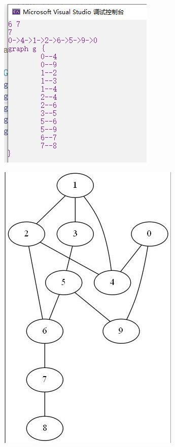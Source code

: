 \documentclass[UTF8]{article}
\begin{document}
	\begin{figure}[H]
		\begin{minipage}[H]{0.48\linewidth}
			\centering
			\includegraphics[scale=0.45]{output12.jpg}
			\label{output12}
		\end{minipage}
		\qquad
		\begin{minipage}[H]{0.48\linewidth}
			\centering
			\includegraphics[scale=0.45]{output121.jpg}
			\label{output121}
		\end{minipage}
	\end{figure}
	
\end{document}
